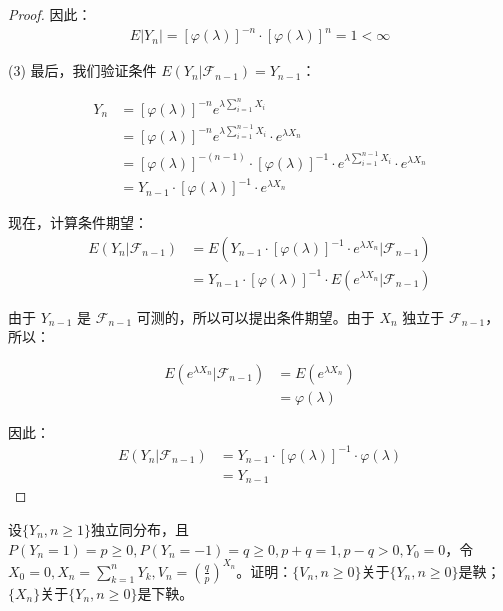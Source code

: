 \documentclass[lang=cn,10pt,thmcnt=section]{elegantbook}
\begin{document}
\begin{proof}
因此：
\begin{align}
E|Y_n| = [\varphi(\lambda)]^{-n} \cdot [\varphi(\lambda)]^n = 1 < \infty
\end{align}

(3) 最后，我们验证条件 $E(Y_n|\mathcal{F}_{n-1}) = Y_{n-1}$：

\begin{align}
Y_n &= [\varphi(\lambda)]^{-n} e^{\lambda \sum_{i=1}^{n} X_i} \\
&= [\varphi(\lambda)]^{-n} e^{\lambda \sum_{i=1}^{n-1} X_i} \cdot e^{\lambda X_n} \\
&= [\varphi(\lambda)]^{-(n-1)} \cdot [\varphi(\lambda)]^{-1} \cdot e^{\lambda \sum_{i=1}^{n-1} X_i} \cdot e^{\lambda X_n} \\
&= Y_{n-1} \cdot [\varphi(\lambda)]^{-1} \cdot e^{\lambda X_n}
\end{align}

现在，计算条件期望：
\begin{align}
E(Y_n|\mathcal{F}_{n-1}) &= E\left(Y_{n-1} \cdot [\varphi(\lambda)]^{-1} \cdot e^{\lambda X_n} | \mathcal{F}_{n-1}\right) \\
&= Y_{n-1} \cdot [\varphi(\lambda)]^{-1} \cdot E\left(e^{\lambda X_n} | \mathcal{F}_{n-1}\right)
\end{align}

由于 $Y_{n-1}$ 是 $\mathcal{F}_{n-1}$ 可测的，所以可以提出条件期望。由于 $X_n$ 独立于 $\mathcal{F}_{n-1}$，所以：

\begin{align}
E\left(e^{\lambda X_n} | \mathcal{F}_{n-1}\right) &= E\left(e^{\lambda X_n}\right) \\
&= \varphi(\lambda)
\end{align}

因此：
\begin{align}
E(Y_n|\mathcal{F}_{n-1}) &= Y_{n-1} \cdot [\varphi(\lambda)]^{-1} \cdot \varphi(\lambda) \\
&= Y_{n-1}
\end{align}
\end{proof}
\begin{example}
	设$\{Y_n, n \geq 1\}$独立同分布，且$P(Y_n = 1) = p \geq 0, P(Y_n = -1) = q \geq 0, p + q = 1, p - q > 0, Y_0 = 0$，令$X_0 = 0, X_n = \sum_{k=1}^{n} Y_k, V_n = \left(\frac{q}{p}\right)^{X_n}$。证明：$\{V_n, n \geq 0\}$关于$\{Y_n, n \geq 0\}$是鞅；$\{X_n\}$关于$\{Y_n, n \geq 0\}$是下鞅。
\end{example}
\end{document}
